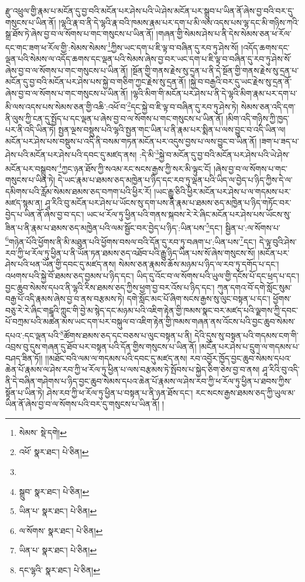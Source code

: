 རྫུ་འཕྲུལ་གྱི་རྣམ་པ་མངོན་དུ་བྱ་བའི་མངོན་པར་ཤེས་པའི་ཡེ་ཤེས་མངོན་པར་སྒྲུབ་པ་ཡིན་ནོ་ཞེས་བྱ་བའི་བར་དུ་གསུངས་པ་ཡིན་ནོ། །ལྷའི་རྣ་བ་ནི་དེ་ལྷའི་རྣ་བའི་ཁམས་རྣམ་པར་དག་པ་མི་ལས་འདས་པས་ལྷ་དང་མི་གཉིས་ཀའི་སྒྲ་ཐོས་ཏེ་ཞེས་བྱ་བ་ལ་སོགས་པ་གང་གསུངས་པ་ཡིན་ནོ། །གཞན་གྱི་སེམས་ཤེས་པ་ནི་དེས་སེམས་ཅན་ཕ་རོལ་དང་གང་ཟག་ཕ་རོལ་གྱི་:སེམས་སེམས་\footnote{སེམས་  སྡེ་དགེ། }ཀྱིས་ཡང་དག་པ་ཇི་ལྟ་བ་བཞིན་དུ་རབ་ཏུ་ཤེས་སོ། །འདོད་ཆགས་དང་ལྡན་པའི་སེམས་ལ་འདོད་ཆགས་དང་ལྡན་པའི་སེམས་ཞེས་བྱ་བར་ཡང་དག་པ་ཇི་ལྟ་བ་བཞིན་དུ་རབ་ཏུ་ཤེས་སོ་ཞེས་བྱ་བ་ལ་སོགས་པ་གང་གསུངས་པ་ཡིན་ནོ། །སྔོན་གྱི་གནས་རྗེས་སུ་དྲན་པ་ནི་དེ་སྔོན་གྱི་གནས་རྗེས་སུ་དྲན་པ་མངོན་དུ་བྱ་བའི་མངོན་པར་ཤེས་པས་སྐྱེ་བ་གཅིག་ཀྱང་རྗེས་སུ་དྲན་ནོ། །སྐྱེ་བ་བརྒྱའི་བར་དུ་ཡང་རྗེས་སུ་དྲན་ནོ་ཞེས་བྱ་བ་ལ་སོགས་པ་གང་གསུངས་པ་ཡིན་ནོ། །ལྷའི་མིག་གི་མངོན་པར་ཤེས་པ་ནི་དེ་ལྷའི་མིག་རྣམ་པར་དག་པ་མི་ལས་འདས་པས་སེམས་ཅན་གྱི་འཆི་:འཕོ་བ་\footnote{འཕོ་  སྣར་ཐང་།  པེ་ཅིན། }དང་སྐྱེ་བ་ཇི་ལྟ་བ་བཞིན་དུ་རབ་ཏུ་ཤེས་ཏེ། སེམས་ཅན་འདི་དག་ནི་ལུས་ཀྱི་ངན་དུ་སྤྱོད་པ་དང་ལྡན་པ་ཞེས་བྱ་བ་ལ་སོགས་པ་གང་གསུངས་པ་ཡིན་ནོ། །མིག་འདི་གཉིས་ཀྱི་ཁྱད་པར་ནི་འདི་ཡིན་ཏེ། སྤྱན་ལྔས་བསྡུས་པའི་ལྷའི་སྤྱན་གང་ཡིན་པ་ནི་རྣམ་པར་སྨིན་པ་ལས་བྱུང་བ་འདི་ཡིན་ལ། མངོན་པར་ཤེས་པས་བསྡུས་པ་འདི་ནི་བསམ་གཏན་མངོན་པར་འདུས་བྱས་པ་ལས་བྱུང་བ་ཡིན་ནོ། །ཟག་པ་ཟད་པ་ཤེས་པའི་མངོན་པར་ཤེས་པའི་དབང་དུ་མཛད་ནས། :དེ་མི་\footnote{}སྐྱེ་བ་མངོན་དུ་བྱ་བའི་མངོན་པར་ཤེས་པའི་ཡེ་ཤེས་མངོན་པར་བསྒྲུབས་\footnote{སྒྲུབ་  སྣར་ཐང་།  པེ་ཅིན། }ཀྱང་ཉན་ཐོས་ཀྱི་སའམ་རང་སངས་རྒྱས་ཀྱི་སར་མི་ལྟུང་ངོ། །ཞེས་བྱ་བ་ལ་སོགས་པ་གང་གསུངས་པ་ཡིན་ཏེ། དེ་ཡང་རྣམ་པ་ཐམས་ཅད་མཁྱེན་པ་ཉིད་དང་རབ་ཏུ་ལྡན་པའི་ཡིད་ལ་བྱེད་པ་ཉིད་ཀྱིས་དེ་ལ་དམིགས་པའི་རློམ་སེམས་ཐམས་ཅད་བཀག་པའི་ཕྱིར་རོ། །ཡང་རྒྱུ་ཅིའི་ཕྱིར་མངོན་པར་ཤེས་པ་ལ་གདམས་པར་མཛད་སྙམ་ན། ཤཱ་རིའི་བུ་མངོན་པར་ཤེས་པ་ཡོངས་སུ་དག་པས་ནི་རྣམ་པ་ཐམས་ཅད་མཁྱེན་པ་ཉིད་གཏོང་བར་བྱེད་པ་ཡིན་ནོ་ཞེས་བྱ་བ་དང་། ཡང་ཕ་རོལ་ཏུ་ཕྱིན་པའི་གནས་སྐབས་རེ་རེ་ཞིང་མངོན་པར་ཤེས་པས་ཡོངས་སུ་ཟིན་པ་ནི་རྣམ་པ་ཐམས་ཅད་མཁྱེན་པའི་ལམ་སྦྱོང་བར་བྱེད་པ་ཉིད་:ཡིན་པས་\footnote{ཡིན་པ་  སྣར་ཐང་།  པེ་ཅིན། }དང་། སྦྱིན་པ་:ལ་སོགས་པ་\footnote{ལ་སོགས་  སྣར་ཐང་།  པེ་ཅིན། }གཉེན་པོའི་ཕྱོགས་ནི་མི་མཐུན་པའི་ཕྱོགས་བསལ་བའི་དོན་དུ་རབ་ཏུ་བཞག་པ་:ཡིན་པས་\footnote{ཡིན་པ་  སྣར་ཐང་།  པེ་ཅིན། }དང་། དེ་ལྟ་བུའི་ཤེས་རབ་ཀྱི་ཕ་རོལ་ཏུ་ཕྱིན་པ་ནི་ཡོན་ཏན་ཐམས་ཅད་འཐོབ་པའི་རྒྱུ་ཉིད་ཡིན་པས་སོ་ཞེས་གསུངས་སོ། །མངོན་པར་ཤེས་པའི་ཕན་ཡོན་གྱི་དབང་དུ་མཛད་ནས། སེམས་ཅན་རྣམས་ཆོས་མཉམ་པ་ཉིད་ལ་རབ་ཏུ་དགོད་པ་དང་། འཕགས་པའི་སྐྱེ་བོ་ཐམས་ཅད་བྱམས་པ་ཉིད་དང་། ཡིད་དུ་འོང་བ་ལ་སོགས་པའི་ཡུལ་གྱི་དངོས་པོ་དང་ཕྲད་པ་དང་། བྱང་ཆུབ་སེམས་དཔའ་ནི་ལྷའི་རིས་ཐམས་ཅད་ཀྱིས་ཕྱག་བྱ་བར་འོས་པ་ཉིད་དང་། ཀུན་དགའ་བོ་དགེ་སློང་སུམ་བརྒྱ་པོ་འདི་རྣམས་ཞེས་བྱ་བ་ནས་བརྩམས་ཏེ། དགེ་སློང་མང་པོ་ཞིག་སངས་རྒྱས་སུ་ལུང་བསྟན་པ་དང་། ཕྱོགས་བཅུ་རེ་རེ་ཞིང་གངྒཱའི་ཀླུང་གི་བྱེ་མ་སྙེད་དང་མཉམ་པའི་འཇིག་རྟེན་གྱི་ཁམས་སྣང་བར་མཛད་པའི་ལྗགས་ཀྱི་དབང་པོ་བཀྲམ་པའི་མཚན་མས་ཡང་དག་པར་བསྐུལ་བ་འཇིག་རྟེན་གྱི་ཁམས་གཞན་ནས་འོངས་པའི་བྱང་ཆུབ་སེམས་དཔའ་:དང་ལྡན་པའི་\footnote{དང་ལྷའི་  སྣར་ཐང་།  པེ་ཅིན། }ཚོགས་ཐམས་ཅད་དང་བཅས་པ་ལུང་བསྟན་པ་ནི། དེའི་དུས་སུ་བསྟན་པའི་གདམས་ངག་གི་འབྲས་བུ་དུས་གཞན་དུ་ཐོབ་པར་བསྟན་པའི་དོན་གྱིས་གསུངས་པ་ཡིན་ནོ། །མངོན་པར་ཤེས་པ་དྲུག་ལ་གདམས་པ་བཤད་ཟིན་ཏོ།། །།མཐོང་བའི་ལམ་ལ་གདམས་པའི་དབང་དུ་མཛད་ནས། རབ་འབྱོར་ཁྱོད་བྱང་ཆུབ་སེམས་དཔའ་ཆེན་པོ་རྣམས་ལ་ཤེས་རབ་ཀྱི་ཕ་རོལ་ཏུ་ཕྱིན་པ་ལས་བརྩམས་ཏེ་སྤོབས་པ་སྐྱེད་ཅིག་ཅེས་བྱ་བ་ནས། ཤཱ་རིའི་བུ་འདི་ནི་དེ་བཞིན་གཤེགས་པ་ཉིད་བྱང་ཆུབ་སེམས་དཔའ་ཆེན་པོ་རྣམས་ལ་ཤེས་རབ་ཀྱི་ཕ་རོལ་ཏུ་ཕྱིན་པ་ཐབས་ཀྱིས་སྟོན་པ་ཡིན་ཏེ། ཤེས་རབ་ཀྱི་ཕ་རོལ་ཏུ་ཕྱིན་པ་བསྟན་པ་ནི་ཉན་ཐོས་དང་། རང་སངས་རྒྱས་ཐམས་ཅད་ཀྱི་ཡུལ་མ་ཡིན་ནོ་ཞེས་བྱ་བ་ལ་སོགས་པའི་བར་དུ་གསུངས་པ་ཡིན་ནོ། །
